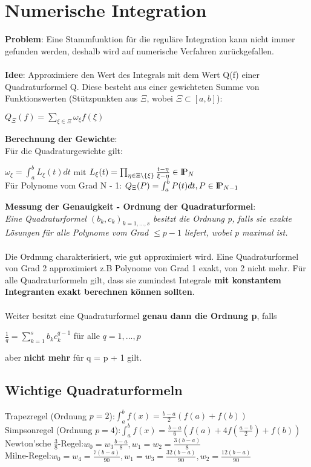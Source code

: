 \documentclass[10pt,a4paper]{article}
\def\polynomials{{\rm I\!P}}
\begin{document}
	\section{Numerische Integration}
	\textbf{Problem}: Eine Stammfunktion für die reguläre Integration kann nicht immer gefunden werden, deshalb wird auf numerische Verfahren zurückgefallen.\\\\
	\textbf{Idee}: Approximiere den Wert des Integrals mit dem Wert Q(f) einer Quadraturformel Q. Diese besteht aus einer gewichteten Summe von Funktionswerten (Stützpunkten aus $\Xi$, wobei $\Xi \subset [a, b]$):
	\begin{center}
		$Q_\Xi(f) = \sum_{\xi \in \Xi}^{}\omega_\xi f(\xi)$
	\end{center}
	\textbf{Berechnung der Gewichte}:\\
	Für die Quadraturgewichte gilt:
	\begin{center}
		$\omega_\xi = \int_{a}^{b}L_\xi(t)dt$ mit $L_\xi(t) = \prod_{\eta \in \Xi \setminus \{\xi\}}^{} \frac{t - \eta}{\xi - \eta} \in \polynomials_N$\\
		Für Polynome vom Grad N - 1: $Q_\Xi(P) = \int_{a}^{b}P(t)dt, P \in \polynomials_{N - 1}$
	\end{center}
  \textbf{Messung der Genauigkeit - Ordnung der Quadraturformel}:\\
  \textit{Eine Quadraturformel $(b_k, c_k)_{k=1,...,s}$ besitzt die Ordnung p, falls sie exakte Lösungen für alle Polynome vom Grad $\leq p - 1$ liefert, wobei p maximal ist.}\\\\
  Die Ordnung charakterisiert, wie gut approximiert wird. Eine Quadraturformel von Grad 2 approximiert z.B Polynome von Grad 1 exakt, von 2 nicht mehr. Für alle Quadraturformeln gilt, dass sie zumindest Integrale \textbf{mit konstantem Integranten exakt berechnen können sollten}.\\\\
  Weiter besitzt eine Quadraturformel \textbf{genau dann die Ordnung p}, falls
  \begin{center}
  	$\frac{1}{q} = \sum_{k = 1}^{s}b_kc_k^{q-1}$ für alle $q = 1, ..., p$
  \end{center}
  aber \textbf{nicht mehr} für q = p + 1 gilt.
  \newpage
  \subsection{Wichtige Quadraturformeln}
        Trapezregel (Ordnung $p = 2$):\hfill$\int_{a}^{b} f(x) = \frac{b - a}{2} (f(a) + f(b))$ \\
        Simpsonregel (Ordnung $p = 4$):\hfill$\int_{a}^{b} f(x) = \frac{b - a}{6} (f(a) + 4f(\frac{a-b}{2}) + f(b))$ \\
        Newton'sche $\frac{3}{8}$-Regel:\hfill$w_0 = w_3 \frac{b - a}{8}, w_1 = w_2 = \frac{3(b - a)}{8}$ \\
        Milne-Regel:\hfill$w_0 = w_4 = \frac{7(b - a)}{90}, w_1 = w_3 = \frac{32(b - a)}{90}, w_2 = \frac{12(b - a)}{90}$ \\
\end{document}
